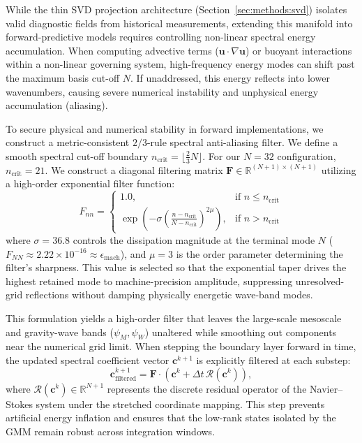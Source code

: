 While the thin SVD projection architecture (Section~\ref{sec:methods:svd}) isolates valid diagnostic fields from historical measurements, extending this manifold into forward-predictive models requires controlling non-linear spectral energy accumulation. When computing advective terms ($\mathbf{u} \cdot \nabla \mathbf{u}$) or buoyant interactions within a non-linear governing system, high-frequency energy modes can shift past the maximum basis cut-off $N$. If unaddressed, this energy reflects into lower wavenumbers, causing severe numerical instability and unphysical energy accumulation (aliasing).

To secure physical and numerical stability in forward implementations, we construct a metric-consistent $2/3$-rule spectral anti-aliasing filter. We define a smooth spectral cut-off boundary $n_{\mathrm{crit}} = \lfloor \frac{2}{3} N \rfloor$. For our $N=32$ configuration, $n_{\mathrm{crit}} = 21$. We construct a diagonal filtering matrix $\mathbf{F} \in \mathbb{R}^{(N+1) \times (N+1)}$ utilizing a high-order exponential filter function:
\begin{equation}
F_{nn} = \begin{cases}
1.0, & \text{if } n \le n_{\mathrm{crit}} \\
\exp\left( -\sigma \left( \frac{n - n_{\mathrm{crit}}}{N - n_{\mathrm{crit}}} \right)^{\! 2\mu} \right), & \text{if } n > n_{\mathrm{crit}}
\end{cases}
\label{eq:exponential_filter}
\end{equation}
where $\sigma = 36.8$ controls the dissipation magnitude at the terminal mode $N$ ($F_{NN} \approx 2.22 \times 10^{-16} \approx \epsilon_{\mathrm{mach}}$), and $\mu = 3$ is the order parameter determining the filter's sharpness. This value is selected so that the exponential taper drives the highest retained mode to machine-precision amplitude, suppressing unresolved-grid reflections without damping physically energetic wave-band modes.

This formulation yields a high-order filter that leaves the large-scale mesoscale and gravity-wave bands ($\psi_M, \psi_W$) unaltered while smoothing out components near the numerical grid limit. When stepping the boundary layer forward in time, the updated spectral coefficient vector $\mathbf{c}^{k+1}$ is explicitly filtered at each substep:
\begin{equation}
\mathbf{c}^{k+1}_{\mathrm{filtered}} = \mathbf{F} \cdot \left( \mathbf{c}^k + \Delta t \, \mathbf{\mathcal{R}}(\mathbf{c}^k) \right),
\label{eq:filtered_time_step}
\end{equation}
where $\mathbf{\mathcal{R}}(\mathbf{c}^k) \in \mathbb{R}^{N+1}$ represents the discrete residual operator of the Navier--Stokes system under the stretched coordinate mapping. This step prevents artificial energy inflation and ensures that the low-rank states isolated by the GMM remain robust across integration windows.

